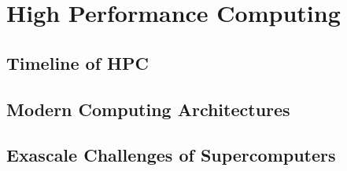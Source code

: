 \chapter{High Performance Computing}

\section{Timeline of HPC}

\section{Modern Computing Architectures}

\section{Exascale Challenges of Supercomputers}
